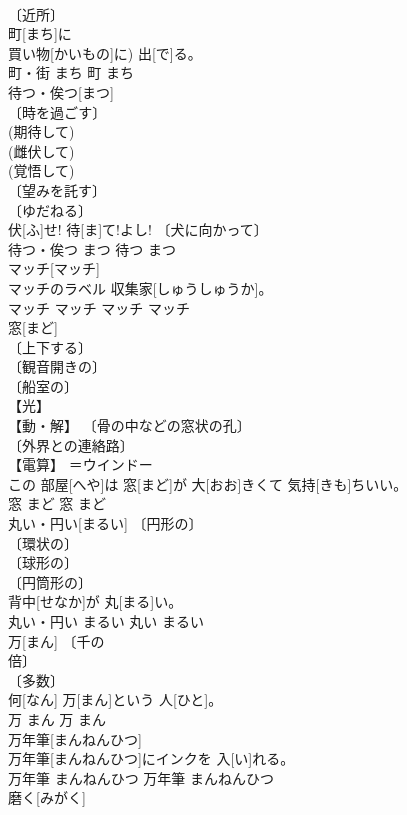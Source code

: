 \documentclass[8pt]{extreport}
\begin{document}
\begin{CJK}{UTF8}{min}
\\	〔近所〕 
\\	町[まち]に
\\	買い物[かいもの]に) 出[で]る。	
\\	町・街	まち	町	まち	
\\	待つ・俟つ[まつ]	
\\	〔時を過ごす〕 
\\	(期待して) 
\\	(雌伏して) 
\\	(覚悟して) 
\\	〔望みを託す〕 
\\	〔ゆだねる〕 
\\	伏[ふ]せ! 待[ま]て!よし!	〔犬に向かって〕 
\\	待つ・俟つ	まつ	待つ	まつ	
\\	マッチ[マッチ]	
\\	マッチのラベル 収集家[しゅうしゅうか]。	
\\	マッチ	マッチ	マッチ	マッチ	
\\	窓[まど]	
\\	〔上下する〕 
\\	〔観音開きの〕 
\\	〔船室の〕 
\\	【光】 
\\	【動・解】 〔骨の中などの窓状の孔〕 
\\	〔外界との連絡路〕 
\\	【電算】 ＝ウインドー 
\\	この 部屋[へや]は 窓[まど]が 大[おお]きくて 気持[きも]ちいい。	
\\	窓	まど	窓	まど	
\\	丸い・円い[まるい]	〔円形の〕 
\\	〔環状の〕 
\\	〔球形の〕 
\\	〔円筒形の〕 
\\	背中[せなか]が 丸[まる]い。	
\\	丸い・円い	まるい	丸い	まるい	
\\	万[まん]	〔千の 
\\	倍〕 
\\	〔多数〕 
\\	何[なん] 万[まん]という 人[ひと]。	
\\	万	まん	万	まん	
\\	万年筆[まんねんひつ]	
\\	万年筆[まんねんひつ]にインクを 入[い]れる。	
\\	万年筆	まんねんひつ	万年筆	まんねんひつ	
\\	磨く[みがく]	

\end{CJK}
\end{document}

